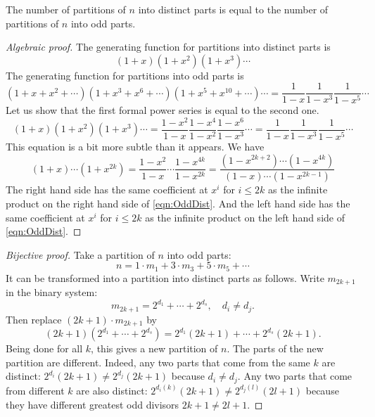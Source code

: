 \begin{page}
\setcounter{section}{3}
\setcounter{subsection}{5}
\setcounter{dfn}{11}
\label{portion:919}

\begin{thm}
The number of partitions of $n$ into distinct parts is equal to the number of partitions of $n$ into odd parts.
\end{thm}

\end{page}

\begin{page}
\setcounter{section}{3}
\setcounter{subsection}{5}
\setcounter{dfn}{11}
\label{portion:920}

\begin{proof}[Algebraic proof]
The generating function for partitions into distinct parts is
\[
(1+x)(1+x^2)(1+x^3)\cdots
\]
The generating function for partitions into odd parts is
\[
(1+x+x^2+\cdots)(1+x^3+x^6+\cdots)(1+x^5+x^{10}+\cdots)\cdots = \frac1{1-x} \frac1{1-x^3} \frac1{1-x^5} \cdots
\]
Let us show that the first formal power series is equal to the second one.
\begin{equation}
\label{eqn:OddDist}
(1+x)(1+x^2)(1+x^3)\cdots = \frac{1-x^2}{1-x} \frac{1-x^4}{1-x^2} \frac{1-x^6}{1-x^3} \cdots = \frac1{1-x} \frac1{1-x^3} \frac1{1-x^5} \cdots
\end{equation}
This equation is a bit more subtle than it appears.
We have
\[
(1+x) \cdots (1+x^{2k}) = \frac{1-x^2}{1-x} \cdots \frac{1-x^{4k}}{1-x^{2k}} = \frac{(1-x^{2k+2}) \cdots (1-x^{4k})}{(1-x) \cdots (1-x^{2k-1})}
\]
The right hand side has the same coefficient at $x^i$ for $i \le 2k$ as the infinite product on the right hand side of \eqref{eqn:OddDist}.
And the left hand side has the same coefficient at $x^i$ for $i \le 2k$ as the infinite product on the left hand side of \eqref{eqn:OddDist}.
\end{proof}

\begin{proof}[Bijective proof]
Take a partition of $n$ into odd parts:
\[
n = 1 \cdot m_1 + 3 \cdot m_3 + 5 \cdot m_5 + \cdots
\]
It can be transformed into a partition into distinct parts as follows.
Write $m_{2k+1}$ in the binary system:
\[
m_{2k+1} = 2^{d_1} + \cdots + 2^{d_s}, \quad d_i \ne d_j.
\]
Then replace $(2k+1) \cdot m_{2k+1}$ by
\[
(2k+1)(2^{d_1} + \cdots + 2^{d_s}) = 2^{d_1}(2k+1) + \cdots + 2^{d_s}(2k+1).
\]
Being done for all $k$, this gives a new partition of $n$.
The parts of the new partition are different.
Indeed, any two parts that come from the same $k$ are distinct: $2^{d_i}(2k+1) \ne 2^{d_j}(2k+1)$ because $d_i \ne d_j$.
Any two parts that come from different $k$ are also distinct: $2^{d_i(k)}(2k+1) \ne 2^{d_j(l)}(2l+1)$
because they have different greatest odd divisors $2k+1 \ne 2l+1$.


\end{proof}
\end{page}
